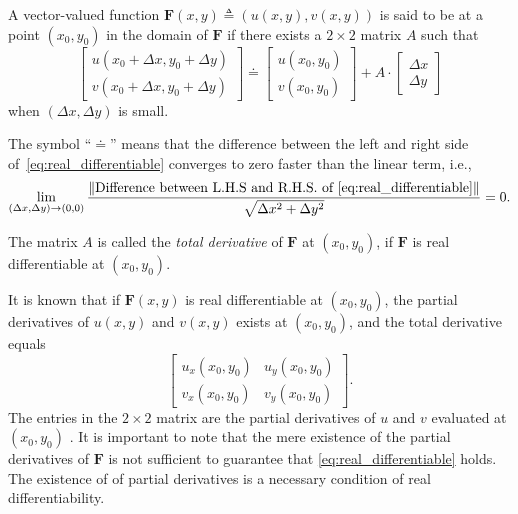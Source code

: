 \begin{svgraybox}
	\begin{definition} 
A vector-valued function $\mathbf{F}(x,y)\triangleq (u(x,y), v(x,y))$ is said to be  at a point $(x_0,y_0)$ in the domain of $\mathbf{F}$ if there exists a $2\times 2$ matrix $A$ such that 
\begin{equation}
	\begin{bmatrix} u(x_0+\Delta x, y_0+\Delta y) \\ v(x_0+\Delta x, y_0 + \Delta y) \end{bmatrix} 
\doteq
\begin{bmatrix} u(x_0,y_0) \\ v(x_0,y_0) \end{bmatrix}	+
	 A \cdot
	\begin{bmatrix} \Delta x \\ \Delta y \end{bmatrix}
	\label{eq:real_differentiable}
\end{equation}
when $(\Delta x, \Delta y)$ is small.
	\end{definition}
\end{svgraybox}

The symbol ``$\doteq$'' means that the difference between the left and right side of~\eqref{eq:real_differentiable} converges to zero faster than the linear term, i.e.,
\begin{equation}
\lim_{(\Delta x, \Delta y)\rightarrow (0,0)} \frac{\| \text{Difference between L.H.S and R.H.S. of \eqref{eq:real_differentiable}}\|}{\sqrt{\Delta x^2 + \Delta y^2}} =0.
\label{eq:real_differentiable2}
\end{equation}

The matrix $A$ is called the {\em total derivative} of $\mathbf{F}$ at $(x_0,y_0)$, if $\mathbf{F}$ is real differentiable at $(x_0,y_0)$. 


It is known that if $\mathbf{F}(x,y)$ is real differentiable at $(x_0,y_0)$, the partial derivatives of $u(x,y)$ and $v(x,y)$ exists at $(x_0,y_0)$, and the total derivative equals
$$
\begin{bmatrix} u_x(x_0,y_0) & u_y(x_0,y_0) \\ v_x(x_0,y_0) & v_y(x_0,y_0) \end{bmatrix}.
$$
The entries in the $2\times 2$ matrix are the partial derivatives of $u$ and $v$ evaluated at $(x_0,y_0)$ \cite[Theorem 9.17]{Rudin}. 
It is important to note that the mere existence of the partial derivatives of $\mathbf{F}$ is not sufficient to guarantee that \eqref{eq:real_differentiable} holds. The existence of of partial derivatives is a necessary condition of real differentiability.

